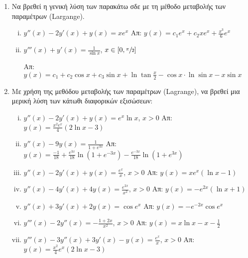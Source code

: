 \begin{enumerate}
\begin{enumerate}[i)]
\end{enumerate}

\item Να βρεθεί η γενική λύση των παρακάτω σδε με τη μέθοδο μεταβολής των παραμέτρων 
  (Largange).

\begin{enumerate}[i)]
  \item $y''(x)-2y'(x)+y(x)=xe^{x}$ \hfill Απ: $y(x)=c_{1}e^{x}+c_{2}xe^{x}+\frac{x^{3}}{6}e^{x}$
  \item $y'''(x)+y'(x)=\frac{1}{\sin x}$, $x\in [0,\sfrac{\pi}{2}]$

   \hfill Απ: $y(x)=c_{1}+c_2\cos x+c_3 \sin x+\ln \tan \frac{x}{2}-\cos x\cdot\ln\sin x-x\sin x$

   \end{enumerate}

   \item Με χρήση της μεθόδου μεταβολής των παραμέτρων (Lagrange), να βρεθεί μια μερική λύση των κάτωθι διαφορικών εξισώσεων:

   \begin{enumerate}[i)]
  \item $y''(x)-2y'(x)+y(x)=e^{x}\ln x$, $x>0$ \hfill Απ: $y(x)=\frac{x^{2}e^{x}}{4}(2\ln x-3)$
  \item $y''(x)-9y(x)=\frac{1}{1+e^{3x}}$ \hfill Απ: $y(x)=\frac{-1}{18}+\frac{e^{3x}}{18}\ln (1+e^{-3x})-\frac{e^{-3x}}{18}\ln(1+e^{3x})$
  \item $y''(x)-2y'(x)+y(x)=\frac{e^x}{x}$, $x>0$ \hfill Απ: $y(x)=xe^{x}(\ln x-1)$
  \item $y''(x)-4y'(x)+4y(x)=\frac{e^{2x}}{x^{2}}$, $x>0$ \hfill Απ: $y(x)=-e^{2x}(\ln x +1)$
  \item $y''(x)+3y'(x)+2y(x)=\cos e^{x}$ \hfill Απ: $y(x)=-e^{-2x}\cos e^{x}$
  \item $y'''(x)-2y''(x)=-\frac{1+2x}{x^{2}}$, $x>0$ \hfill Απ: $y(x)=x\ln x-x -\frac{1}{2}$
  \item $y'''(x)-3y''(x)+3y'(x)-y(x)=\frac{e^{x}}{x}$, $x>0$ \hfill Απ: $y(x)=\frac{x^{2}}{4}e^{x}(2\ln x-3)$
\end{enumerate}

\end{enumerate}





